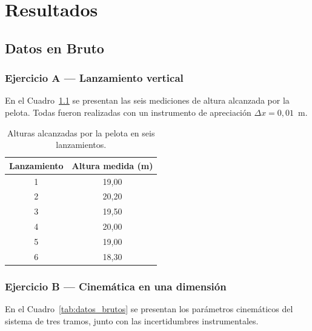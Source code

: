 \chapter{Resultados}
\thispagestyle{fancy}
\label{ch:resultados}

\section{Datos en Bruto}

\subsection*{Ejercicio A — Lanzamiento vertical}

En el Cuadro~\ref{tab:alturas} se presentan las seis mediciones de altura
alcanzada por la pelota. Todas fueron realizadas con un instrumento de
apreciación $\Delta x = 0{,}01$~m.

\begin{table}[htbp]
  \centering
  \begin{tabular}{c c}
    \toprule
    Lanzamiento & Altura medida (m) \\
    \midrule
    1 & 19{,}00 \\
    2 & 20{,}20 \\
    3 & 19{,}50 \\
    4 & 20{,}00 \\
    5 & 19{,}00 \\
    6 & 18{,}30 \\
    \bottomrule
  \end{tabular}
  \caption{Alturas alcanzadas por la pelota en seis lanzamientos.}
  \label{tab:alturas}
\end{table}

\subsection*{Ejercicio B — Cinemática en una dimensión}

En el Cuadro~\ref{tab:datos_brutos} se presentan los parámetros cinemáticos
del sistema de tres tramos, junto con las incertidumbres instrumentales.

